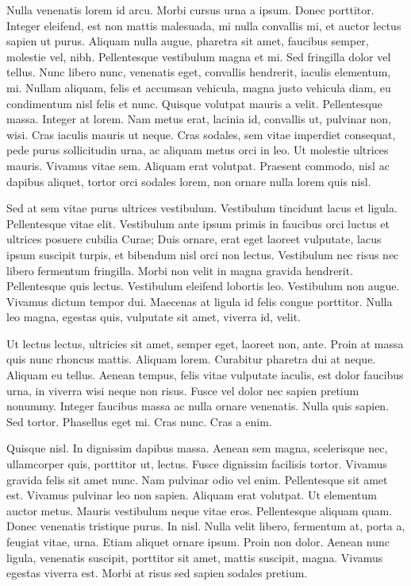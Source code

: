 \documentclass{article}
\begin{document}
Nulla venenatis lorem id arcu. Morbi cursus urna a ipsum. Donec porttitor.
Integer eleifend, est non mattis malesuada, mi nulla convallis mi, et auctor
lectus sapien ut purus. Aliquam nulla augue, pharetra sit amet, faucibus
semper, molestie vel, nibh. Pellentesque vestibulum magna et mi. Sed fringilla
dolor vel tellus. Nunc libero nunc, venenatis eget, convallis hendrerit,
iaculis elementum, mi. Nullam aliquam, felis et accumsan vehicula, magna justo
vehicula diam, eu condimentum nisl felis et nunc. Quisque volutpat mauris a
velit. Pellentesque massa. Integer at lorem. Nam metus erat, lacinia id,
convallis ut, pulvinar non, wisi. Cras iaculis mauris ut neque. Cras sodales,
sem vitae imperdiet consequat, pede purus sollicitudin urna, ac aliquam metus
orci in leo. Ut molestie ultrices mauris. Vivamus vitae sem. Aliquam erat
volutpat. Praesent commodo, nisl ac dapibus aliquet, tortor orci sodales lorem,
non ornare nulla lorem quis nisl.

Sed at sem vitae purus ultrices vestibulum. Vestibulum tincidunt lacus et
ligula. Pellentesque vitae elit. Vestibulum ante ipsum primis in faucibus orci
luctus et ultrices posuere cubilia Curae; Duis ornare, erat eget laoreet
vulputate, lacus ipsum suscipit turpis, et bibendum nisl orci non lectus.
Vestibulum nec risus nec libero fermentum fringilla. Morbi non velit in magna
gravida hendrerit. Pellentesque quis lectus. Vestibulum eleifend lobortis leo.
Vestibulum non augue. Vivamus dictum tempor dui. Maecenas at ligula id felis
congue porttitor. Nulla leo magna, egestas quis, vulputate sit amet, viverra
id, velit.

Ut lectus lectus, ultricies sit amet, semper eget, laoreet non, ante. Proin
at massa quis nunc rhoncus mattis. Aliquam lorem. Curabitur pharetra dui at
neque. Aliquam eu tellus. Aenean tempus, felis vitae vulputate iaculis, est
dolor faucibus urna, in viverra wisi neque non risus. Fusce vel dolor nec
sapien pretium nonummy. Integer faucibus massa ac nulla ornare venenatis. Nulla
quis sapien. Sed tortor. Phasellus eget mi. Cras nunc. Cras a enim.

Quisque nisl. In dignissim dapibus massa. Aenean sem magna, scelerisque nec,
ullamcorper quis, porttitor ut, lectus. Fusce dignissim facilisis tortor.
Vivamus gravida felis sit amet nunc. Nam pulvinar odio vel enim. Pellentesque
sit amet est. Vivamus pulvinar leo non sapien. Aliquam erat volutpat. Ut
elementum auctor metus. Mauris vestibulum neque vitae eros. Pellentesque
aliquam quam. Donec venenatis tristique purus. In nisl. Nulla velit libero,
fermentum at, porta a, feugiat vitae, urna. Etiam aliquet ornare ipsum. Proin
non dolor. Aenean nunc ligula, venenatis suscipit, porttitor sit amet, mattis
suscipit, magna. Vivamus egestas viverra est. Morbi at risus sed sapien sodales
pretium.
\end{document}

